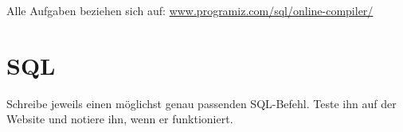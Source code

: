 
\centering
\large Alle Aufgaben beziehen sich auf: \url{www.programiz.com/sql/online-compiler/}

\normalsize
\flushleft



\section{SQL}
Schreibe jeweils einen möglichst genau passenden SQL-Befehl. Teste ihn auf der Website und notiere ihn, wenn er funktioniert.






